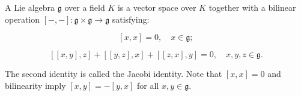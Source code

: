 A Lie algebra $\mathfrak{g}$ over a field $K$ is a vector space over $K$ together with a bilinear operation $[{-},{-}]: \mathfrak{g} \times \mathfrak{g} \to \mathfrak{g}$ satisfying:

$$[x, x] = 0, \quad x \in \mathfrak{g};$$

$$[[x, y], z] + [[y, z], x] + [[z, x], y] = 0, \quad x, y, z \in \mathfrak{g}.$$

The second identity is called the Jacobi identity. Note that $[x, x] = 0$ and bilinearity imply $[x, y] = -[y, x]$ for all $x, y \in \mathfrak{g}$.
